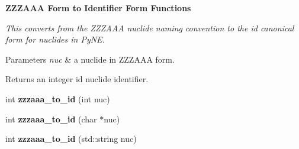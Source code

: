 \begin{Indent}{\bf Z\+Z\+Z\+A\+A\+A Form to Identifier Form Functions}\par
{\em This converts from the Z\+Z\+Z\+A\+A\+A nuclide naming convention to the id canonical form for nuclides in Py\+N\+E. 
\begin{DoxyParams}{Parameters}
{\em nuc} & a nuclide in Z\+Z\+Z\+A\+A\+A form. \\
\hline
\end{DoxyParams}
\begin{DoxyReturn}{Returns}
an integer id nuclide identifier. 
\end{DoxyReturn}
}\begin{DoxyCompactItemize}
\item 
\hypertarget{namespacepyne_1_1nucname_a655aba032448b6a33135b0e7a49e98ad}{int {\bfseries zzzaaa\+\_\+to\+\_\+id} (int nuc)}\label{namespacepyne_1_1nucname_a655aba032448b6a33135b0e7a49e98ad}

\item 
\hypertarget{namespacepyne_1_1nucname_a0d5b73fca1bf6ccc86c6b34647a8fb2d}{int {\bfseries zzzaaa\+\_\+to\+\_\+id} (char $\ast$nuc)}\label{namespacepyne_1_1nucname_a0d5b73fca1bf6ccc86c6b34647a8fb2d}

\item 
\hypertarget{namespacepyne_1_1nucname_a1d83a3f4a7cdc8b712077bfb9a5a1963}{int {\bfseries zzzaaa\+\_\+to\+\_\+id} (std\+::string nuc)}\label{namespacepyne_1_1nucname_a1d83a3f4a7cdc8b712077bfb9a5a1963}

\end{DoxyCompactItemize}
\end{Indent}
